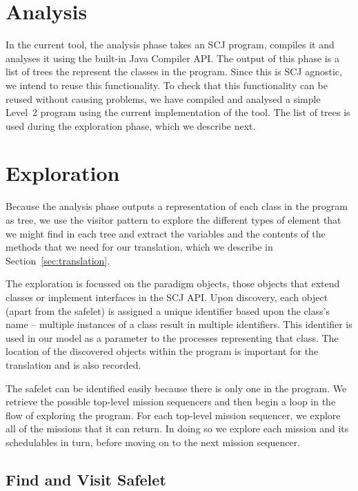 \documentclass[10pt,a4paper]{article}
\begin{document}
\section{Analysis}
\label{sec:analysis}

In the current tool, the analysis phase takes an SCJ program, compiles it and analyses it using the built-in Java Compiler API. The output of this phase is a list of trees the represent the classes in the program. Since this is SCJ agnostic, we intend to reuse this functionality. To check that this functionality can be reused without causing problems, we have compiled and analysed a simple Level~2 program using the current implementation of the tool. The list of trees is used during the exploration phase, which we describe next.

\section{Exploration}
\label{sec:exploration}

Because the analysis phase outputs a representation of each class in the program as tree, we use the visitor pattern to explore the different types of element that we might find in each tree and extract the variables and the contents of the methods that we need for our translation, which we describe in Section~\ref{sec:translation}.

The exploration is focussed on the paradigm objects, those objects that extend classes or implement interfaces in the SCJ API. Upon discovery, each object (apart from the safelet) is assigned a unique identifier based upon the class's name -- multiple instances of a class result in multiple identifiers. This identifier is used in our model as a parameter to the processes representing that class. The location of the discovered objects within the program is important for the translation and is also recorded.

The safelet can be identified easily because there is only one in the program. We retrieve the possible top-level mission sequencers and then begin a loop in the flow of exploring the program. For each top-level mission sequencer, we explore all of the missions that it can return. In doing so we explore each mission and its schedulables in turn, before moving on to the next mission sequencer. 

\subsection{Find and Visit Safelet}
\end{document}
